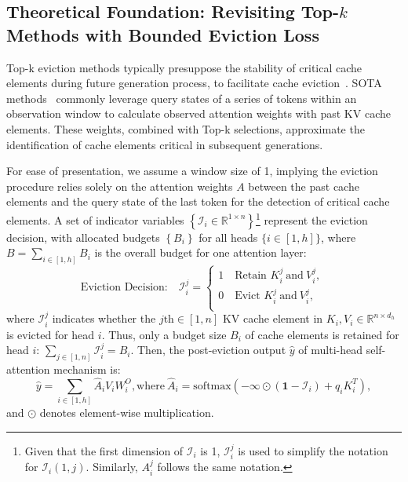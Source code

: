 \subsection{Theoretical Foundation: Revisiting Top-$k$ Methods with Bounded Eviction Loss}
\label{sec:revisiting}
Top-k eviction methods typically presuppose the stability of critical cache elements during future generation process, to facilitate cache eviction~\cite{H2o,SnapKV,PyramidInfer,PyramidKV}. SOTA methods~\cite{SnapKV,PyramidInfer,PyramidKV} commonly leverage query states of a series of tokens within an observation window to calculate observed attention weights with past KV cache elements. These weights, combined with Top-k selections, approximate the identification of cache elements critical in subsequent generations.



For ease of presentation, we assume a window size of 1, implying the eviction procedure relies solely on the attention weights $A$ between the past cache elements and the query state of the last token for the detection of critical cache elements. A set of indicator variables $\left\{\mathcal{I}_i \in \mathbb{R}^{1 \times n}\right\}$\footnote{Given that the first dimension of $\mathcal{I}_i$ is 1, $\mathcal{I}_i^j$ is used to simplify the notation for $\mathcal{I}_i(1, j)$. Similarly, $A_i^j$ follows the same notation.} represent the eviction decision, with allocated budgets $\left\{B_i\right\}$ for all heads $\{i \in [1,h]\}$, where $B = \sum_{i \in [1, h]} B_i$ is the overall budget for one attention layer:
\begin{equation}
\text{Eviction Decision:} \quad	\mathcal{I}_i^j  =
	\begin{cases}
		1 	\quad	  \text{Retain  $K_i^j \: \text{and} \: V_i^j$,   }\\
		0   \quad    \text{Evict  $K_i^j \: \text{and} \: V_i^j$},\\
	\end{cases}
\end{equation}
where $\mathcal{I}_i^j$ indicates whether the $j\text{th} \in [1, n]$ KV cache element in $K_i,V_i \in \mathbb{R}^{n \times d_h}$ is evicted for head $i$.
Thus, only a budget size $B_i$ of cache elements is retained for head $i$: $\sum_{j \in [1,n]} \mathcal{I}_i^j = B_i$.
Then, the post-eviction output $\hat{y}$ of multi-head self-attention mechanism is:
 \begin{equation}
 	\hat{y} = \sum_{i \in [1, h]} \hat{A}_i V_i W_i^O,
 	\text{where} \: \hat{A}_i  = \text{softmax}(-\infty \odot ( \textbf{1} - \mathcal{I}_i) + q_iK_i^{T}),
 \end{equation}
and $\odot$ denotes element-wise multiplication.



